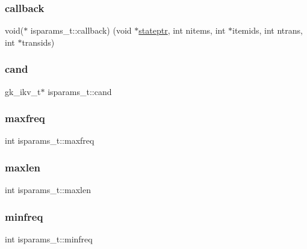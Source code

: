 \subsubsection{\texorpdfstring{callback}{callback}}
{\footnotesize\ttfamily void($\ast$ isparams\+\_\+t\+::callback) (void $\ast$\hyperlink{structisparams__t_a11588df8c18be6e4a5721d68d917b2a7}{stateptr}, int nitems, int $\ast$itemids, int ntrans, int $\ast$transids)}

\mbox{\label{structisparams__t_a714e82249e4f4e55b68721537a06e3bb}} 
\subsubsection{\texorpdfstring{cand}{cand}}
{\footnotesize\ttfamily gk\+\_\+ikv\+\_\+t$\ast$ isparams\+\_\+t\+::cand}

\mbox{\label{structisparams__t_a8ec053e88c745e5ff683e65aa5640205}} 
\subsubsection{\texorpdfstring{maxfreq}{maxfreq}}
{\footnotesize\ttfamily int isparams\+\_\+t\+::maxfreq}

\mbox{\label{structisparams__t_afb1c5ef0ff2184fbd0c739e6ae401e1c}} 
\subsubsection{\texorpdfstring{maxlen}{maxlen}}
{\footnotesize\ttfamily int isparams\+\_\+t\+::maxlen}

\mbox{\label{structisparams__t_a40906758bb0efc7e9c3fdff11d63c412}} 
\subsubsection{\texorpdfstring{minfreq}{minfreq}}
{\footnotesize\ttfamily int isparams\+\_\+t\+::minfreq}

